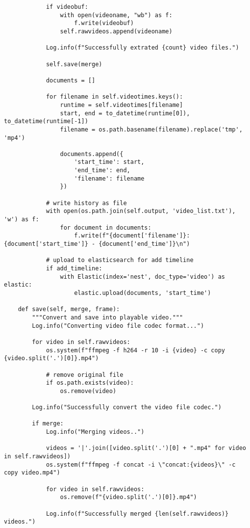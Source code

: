 \documentclass{easychair}
\begin{document}
\begin{lstlisting}
            if videobuf:
                with open(videoname, "wb") as f:
                    f.write(videobuf)
                self.rawvideos.append(videoname)

            Log.info(f"Successfully extrated {count} video files.")

            self.save(merge)

            documents = []

            for filename in self.videotimes.keys():
                runtime = self.videotimes[filename]
                start, end = to_datetime(runtime[0]), to_datetime(runtime[-1])
                filename = os.path.basename(filename).replace('tmp', 'mp4')

                documents.append({
                    'start_time': start,
                    'end_time': end,
                    'filename': filename
                })

            # write history as file
            with open(os.path.join(self.output, 'video_list.txt'), 'w') as f:
                for document in documents:
                    f.write(f"{document['filename']}: {document['start_time']} - {document['end_time']}\n")

            # upload to elasticsearch for add timeline
            if add_timeline:
                with Elastic(index='nest', doc_type='video') as elastic:
                    elastic.upload(documents, 'start_time')

    def save(self, merge, frame):
        """Convert and save into playable video."""
        Log.info("Converting video file codec format...")

        for video in self.rawvideos:
            os.system(f"ffmpeg -f h264 -r 10 -i {video} -c copy {video.split('.')[0]}.mp4")

            # remove original file
            if os.path.exists(video):
                os.remove(video)

        Log.info("Successfully convert the video file codec.")

        if merge:
            Log.info("Merging videos..")

            videos = '|'.join([video.split('.')[0] + ".mp4" for video in self.rawvideos])
            os.system(f"ffmpeg -f concat -i \"concat:{videos}\" -c copy video.mp4")

            for video in self.rawvideos:
                os.remove(f"{video.split('.')[0]}.mp4")

            Log.info(f"Successfully merged {len(self.rawvideos)} videos.")


\end{lstlisting}
\end{document}
